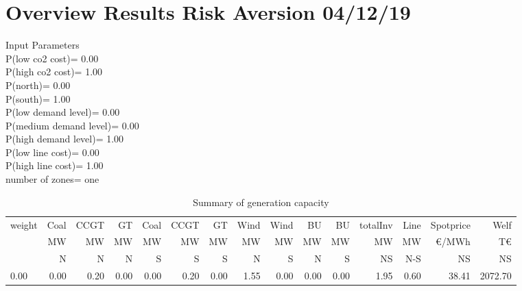 \documentclass[landscape]{article}
\begin{document}
\section*{Overview Results Risk Aversion 04/12/19}
Input Parameters\\
P(low co2 cost)=         0.00\\
P(high co2 cost)=         1.00\\
P(north)=         0.00\\
P(south)=         1.00\\
P(low demand level)=         0.00\\
P(medium demand level)=         0.00\\
P(high demand level)=         1.00\\
P(low line cost)=         0.00\\
P(high line cost)=         1.00\\
number of zones= one\\
\begin{table}[htb]\caption{Summary of generation capacity}
\begin{tabular}{l|rrrrrr|rr|rr|rr|rr}
\toprule
 weight &    Coal &     CCGT &      GT &   Coal  &   CCGT &      GT &    Wind &    Wind  &  BU  &  BU  & totalInv  &    Line   &  Spotprice   &  Welf   \\
        &      MW &       MW &      MW &      MW &     MW &      MW &      MW &      MW  &  MW  &  MW  &    MW     &    MW     &  \euro/MWh &  T\euro   \\
        &       N &       N  &      N  &      S  &      S &       S &       N &       S  &  N   &  S   &    NS     &    N-S    &  NS      &   NS    \\
\midrule
        0.00&        0.00&        0.20&        0.00&        0.00&        0.20&        0.00&        1.55&        0.00&        0.00&        0.00&        1.95&        0.60&       38.41&     2072.70\\
\bottomrule
\end{tabular}
\end{table}
\end{document}
